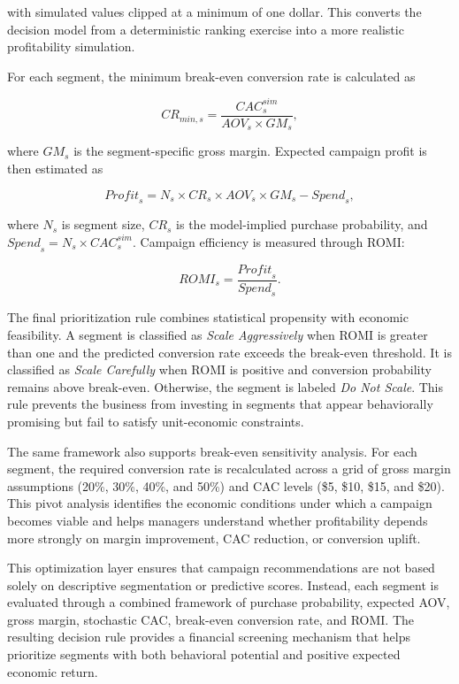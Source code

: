 \documentclass[conference]{IEEEtran}
\begin{document}
with simulated values clipped at a minimum of one dollar. This converts the decision model from a deterministic ranking exercise into a more realistic profitability simulation.

For each segment, the minimum break-even conversion rate is calculated as

\begin{equation}
CR_{min,s}=\frac{CAC_s^{sim}}{AOV_s \times GM_s},
\end{equation}

where $GM_s$ is the segment-specific gross margin. Expected campaign profit is then estimated as

\begin{equation}
\textit{Profit}_s = N_s \times CR_s \times AOV_s \times GM_s - \textit{Spend}_s,
\end{equation}

where $N_s$ is segment size, $CR_s$ is the model-implied purchase probability, and $\textit{Spend}_s=N_s \times CAC_s^{sim}$. Campaign efficiency is measured through ROMI:

\begin{equation}
ROMI_s = \frac{\textit{Profit}_s}{\textit{Spend}_s}.
\end{equation}

The final prioritization rule combines statistical propensity with economic feasibility. A segment is classified as \textit{Scale Aggressively} when ROMI is greater than one and the predicted conversion rate exceeds the break-even threshold. It is classified as \textit{Scale Carefully} when ROMI is positive and conversion probability remains above break-even. Otherwise, the segment is labeled \textit{Do Not Scale}. This rule prevents the business from investing in segments that appear behaviorally promising but fail to satisfy unit-economic constraints.

The same framework also supports break-even sensitivity analysis. For each segment, the required conversion rate is recalculated across a grid of gross margin assumptions (20\%, 30\%, 40\%, and 50\%) and CAC levels (\$5, \$10, \$15, and \$20). This pivot analysis identifies the economic conditions under which a campaign becomes viable and helps managers understand whether profitability depends more strongly on margin improvement, CAC reduction, or conversion uplift.


This optimization layer ensures that campaign recommendations are not based solely on descriptive segmentation or predictive scores. Instead, each segment is evaluated through a combined framework of purchase probability, expected AOV, gross margin, stochastic CAC, break-even conversion rate, and ROMI. The resulting decision rule provides a financial screening mechanism that helps prioritize segments with both behavioral potential and positive expected economic return.
\end{document}
